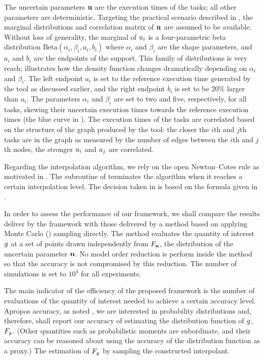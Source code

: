 
The uncertain parameters $\mathbf{u}$ are the execution times of the tasks; all other
parameters are deterministic. Targeting the practical scenario described in
, the marginal distributions and correlation matrix
of $\mathbf{u}$ are assumed to be available. Without loss of generality, the marginal
of $u_i$ is a four-parametric beta distribution $\text{Beta}(\alpha_i, \beta_i,
a_i, b_i)$ where $\alpha_i$ and $\beta_i$ are the shape parameters, and $a_i$
and $b_i$ are the endpoints of the support. This family of distributions is very
reach;  illustrates how the density function changes
dramatically depending on $\alpha_i$ and $\beta_i$. The left endpoint $a_i$ is
set to the reference execution time generated by the  tool as
discussed earlier, and the right endpoint $b_i$ is set to be 20\% larger than
$a_i$. The parameters $\alpha_i$ and $\beta_i$ are set to two and five,
respectively, for all tasks, skewing their uncertain execution times towards the
reference execution times (the blue curve in ). The execution
times of the tasks are correlated based on the structure of the graph produced
by the  tool: the closer the $i$th and $j$th tasks are in the graph
as measured by the number of edges between the $i$th and $j$th nodes, the
stronger $u_i$ and $u_j$ are correlated.

Regarding the interpolation algorithm, we rely on the open Newton--Cotes rule as
motivated in . The  subroutine of
 terminates the algorithm when it reaches a certain
interpolation level. The decision taken in  is based on the
formula given in .

In order to assess the performance of our framework, we shall compare the
results deliver by the framework with those delivered by a method based on
applying Monte Carlo () sampling directly. The  method
evaluates the quantity of interest $g$ at a set of points drawn independently
from $F_{\mathbf{u}}$, the distribution of the uncertain parameter $\mathbf{u}$. No
model order reduction is perform inside the  method so that the
accuracy is not compromised by this reduction. The number of 
simulations is set to $10^4$ for all experiments.

The main indicator of the efficiency of the proposed framework is the number of
evaluations of the quantity of interest needed to achieve a certain accuracy
level. Apropos accuracy, as noted , we are interested in
probability distributions and, therefore, shall report our accuracy of
estimating the distribution function of $g$, $F_g$. (Other
quantities such as probabilistic moments are subordinate, and their accuracy can
be reasoned about using the accuracy of the distribution function as a proxy.)
The estimation of $F_g$ by sampling the constructed interpolant.

